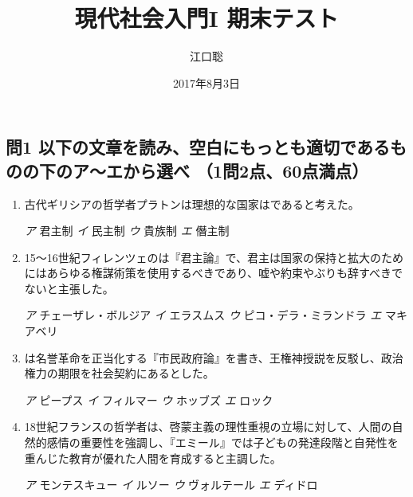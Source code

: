\documentclass[uplatex,dvipdfmx]{jsarticle}
\author{江口聡}
\date{2017年8月3日}
\title{現代社会入門I 期末テスト}
\newcommand{\sentakusi}[4]{
\hspace{.3zw}
\emph{ア}\hspace{1zw} #1 \hspace{2zw} \emph{イ} \hspace{1zw}#2 \hspace{2zw}\emph{ウ}\hspace{1zw} #3 \hspace{2zw}\emph{エ}\hspace{1zw} #4

}
\begin{document}
\maketitle

\subsection*{問1 以下の文章を読み、空白にもっとも適切であるものの下のア〜エから選べ （1問2点、60点満点）}

\begin{enumerate}

\setlength{\parskip}{.9zw}
\setlength{\itemsep}{.9zw}


\item   古代ギリシアの哲学者プラトンは理想的な国家はであると考えた。


  \sentakusi
  {君主制}
  {民主制}
{貴族制}
{僭主制}


\item   15〜16世紀フィレンツェのは『君主論』で、君主は国家の保持と拡大のためにはあらゆる権謀術策を使用するべきであり、嘘や約束やぶりも辞すべきでないと主張した。

\sentakusi
{チェーザレ・ボルジア}
{エラスムス}
{ピコ・デラ・ミランドラ}
{マキアベリ}




\item {}は名誉革命を正当化する『市民政府論』を書き、王権神授説を反駁し、政治権力の期限を社会契約にあるとした。

\sentakusi
{ピープス}
{フィルマー}
{ホッブズ}
{ロック}


\item   18世紀フランスの哲学者は、啓蒙主義の理性重視の立場に対して、人間の自然的感情の重要性を強調し、『エミール』では子どもの発達段階と自発性を重んじた教育が優れた人間を育成すると主調した。


\sentakusi
{モンテスキュー}
{ルソー}
{ヴォルテール}
{ディドロ}


\end{enumerate}
\end{document}
